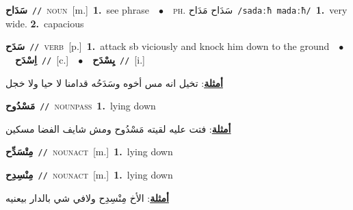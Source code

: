 \documentclass[10pt,a4paper,twoside]{article} %
\begin{document}
\begin{multicols}{2}
{\setlength\topsep{0pt}\textbf{\foreignlanguage{arabic}{سَدَاح}}\ {\color{gray}\texttt{//}\color{black}}\ \textsc{noun}\ [m.]\ \textbf{1.}~see phrase\ \ $\bullet$\ \ \textsc{ph.} \color{gray} \foreignlanguage{arabic}{سَدَاح مَدَاح}\color{black}\ {\color{gray}\texttt{/{\sffamily sadaːħ madaːħ}/}\color{black}}\ \textbf{1.}~very wide.  \textbf{2.}~capacious\ } \vspace{2mm}

{\setlength\topsep{0pt}\textbf{\foreignlanguage{arabic}{سَدَح}}\ {\color{gray}\texttt{//}\color{black}}\ \textsc{verb}\ [p.]\ \textbf{1.}~attack sb viciously and knock him down to the ground\ \ $\bullet$\ \ \setlength\topsep{0pt}\textbf{\foreignlanguage{arabic}{اِسْدَح}}\ {\color{gray}\texttt{//}\color{black}}\ [c.]\ \ $\bullet$\ \ \setlength\topsep{0pt}\textbf{\foreignlanguage{arabic}{يِسْدَح}}\ {\color{gray}\texttt{//}\color{black}}\ [i.]\  \begin{flushright}\color{gray}\foreignlanguage{arabic}{\textbf{\underline{\foreignlanguage{arabic}{أمثلة}}}: تخيل انه مس أخوه وسَدَحُه قدامنا لا حيا ولا خجل}\end{flushright}\color{black}} \vspace{2mm}

{\setlength\topsep{0pt}\textbf{\foreignlanguage{arabic}{مَسْدُوح}}\ {\color{gray}\texttt{//}\color{black}}\ \textsc{noun\textunderscore pass}\ \textbf{1.}~lying down\  \begin{flushright}\color{gray}\foreignlanguage{arabic}{\textbf{\underline{\foreignlanguage{arabic}{أمثلة}}}: فتت عليه لقيته مَسْدُوح ومش شايف الفضا مسكين}\end{flushright}\color{black}} \vspace{2mm}

{\setlength\topsep{0pt}\textbf{\foreignlanguage{arabic}{مِتْسَدِّح}}\ {\color{gray}\texttt{//}\color{black}}\ \textsc{noun\textunderscore act}\ [m.]\ \textbf{1.}~lying down\ } \vspace{2mm}

{\setlength\topsep{0pt}\textbf{\foreignlanguage{arabic}{مِنْسِدِح}}\ {\color{gray}\texttt{//}\color{black}}\ \textsc{noun\textunderscore act}\ [m.]\ \textbf{1.}~lying down\  \begin{flushright}\color{gray}\foreignlanguage{arabic}{\textbf{\underline{\foreignlanguage{arabic}{أمثلة}}}: الأخ مِنْسِدِح ولافي شي بالدار بيعنيه}\end{flushright}\color{black}} \vspace{2mm}


\end{multicols}
\end{document}
